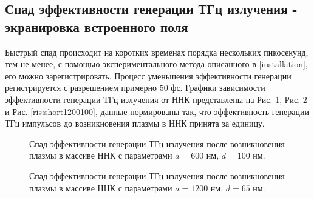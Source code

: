 \documentclass[a4paper,14pt,russian]{extreport}
\begin{document}
			\subsection{Спад эффективности генерации ТГц излучения - экранировка встроенного поля}
				Быстрый спад происходит на коротких временах порядка нескольких пикосекунд, тем не менее, с помощью экспериментального метода описанного в \ref{installation}, его можно зарегистрировать. Процесс уменьшения эффективности генерации регистрируется с разрешением примерно $50 \text{ фс}$. Графики зависимости эффективности генерации ТГц излучения от ННК представлены на Рис. \ref{ris:short600100}, Рис. \ref{ris:short120065} и Рис. \ref{ris:short1200100}, данные нормированы так, что эффективность генерации ТГц импульсов до возникновения плазмы в ННК принята за единицу.\par
				\begin{figure}[H]
					\caption{Спад эффективности генерации ТГц излучения после возникновения плазмы в массиве ННК с параметрами $a = 600 \text{ нм, } d = 100 \text{ нм}$.}
				\label{ris:short600100}
				\end{figure}
				\begin{figure}[H]
					\caption{Спад эффективности генерации ТГц излучения после возникновения плазмы в массиве ННК с параметрами $a = 1200 \text{ нм, } d = 65 \text{ нм}$.}
				\label{ris:short120065}
				\end{figure}
\end{document}

